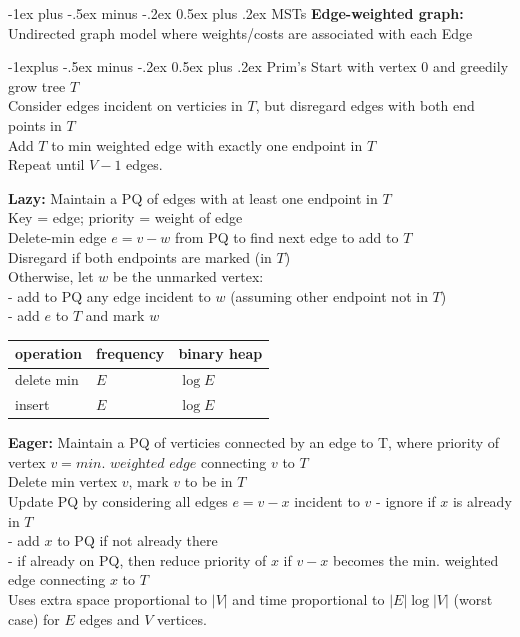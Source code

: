 \documentclass[letterpaper, 8pt]{extarticle}
\makeatletter
\renewcommand{\section}{\@startsection{section}{1}{0mm}%
                                {-1ex plus -.5ex minus -.2ex}%
                                {0.5ex plus .2ex}%
                                {\normalfont\normalsize\bfseries}}
\renewcommand{\subsection}{\@startsection{subsection}{2}{0mm}%
                                {-1explus -.5ex minus -.2ex}%
                                {0.5ex plus .2ex}%
                                {\normalfont\small\bfseries}}
\makeatother
\begin{document}
\begin{multicols*}{5}
  \section{MSTs}
  \textbf{Edge-weighted graph:} Undirected graph model where weights/costs
  are associated with each Edge

  \subsection{Prim's}
  Start with vertex 0 and greedily grow tree $T$ \\
  Consider edges incident on verticies in $T$, but disregard edges with both end points in $T$ \\
  Add $T$ to min weighted edge with exactly one endpoint in $T$ \\
  Repeat until $V-1$ edges.

  \textbf{Lazy:} Maintain a PQ of edges with at least one endpoint in $T$ \\
  Key = edge; priority = weight of edge \\
  Delete-min edge $e = v - w$ from PQ to find next edge to add to $T$ \\
  Disregard if both endpoints are marked (in $T$) \\
  Otherwise, let $w$ be the unmarked vertex: \\
  - add to PQ any edge incident to $w$ (assuming other endpoint not in $T$) \\
  - add $e$ to $T$ and mark $w$ \\
  \begin{tabulary}{\linewidth}{@{}LLL@{}} \toprule
    operation  & frequency & binary heap \\ \midrule
    delete min & $E$       & $\log E$    \\
    insert     & $E$       & $\log E$    \\ \bottomrule
  \end{tabulary}

  \textbf{Eager:} Maintain a PQ of verticies connected by an edge to T,
  where priority of vertex $v = \textit{min. weighted edge}$ connecting $v$ to $T$ \\
  Delete min vertex $v$, mark $v$ to be in $T$ \\
  Update PQ by considering all edges $e = v-x$ incident to $v$
  - ignore if $x$ is already in $T$ \\
  - add $x$ to PQ if not already there \\
  - if already on PQ, then reduce priority of $x$ if $v-x$ becomes the min. weighted edge connecting $x$ to $T$ \\
  Uses extra space proportional to $|V|$ and time proportional to $|E| \log |V|$ (worst case)
  for $E$ edges and $V$ vertices.

\end{multicols*}
\end{document}
